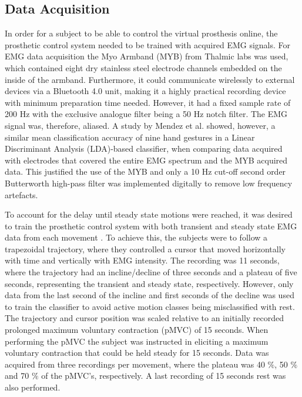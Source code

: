 \subsection{Data Acquisition}

In order for a subject to be able to control the virtual prosthesis online, the prosthetic control system needed to be trained with acquired EMG signals. For EMG data acquisition the Myo Armband (MYB) from Thalmic labs was used, which contained eight dry stainless steel electrode channels embedded on the inside of the armband. Furthermore, it could communicate wirelessly to external devices via a Bluetooth 4.0 unit, making it a highly practical recording device with minimum preparation time needed. However, it had a fixed sample rate of 200 Hz with the exclusive analogue filter being a 50 Hz notch filter. The EMG signal was, therefore, aliased. A study by Mendez et al. \cite{Mendez2017} showed, however, a similar mean classification accuracy of nine hand gestures in a Linear Discriminant Analysis (LDA)-based classifier, when comparing data acquired with electrodes that covered the entire EMG spectrum and the MYB acquired data. This justified the use of the MYB and only a 10 Hz cut-off second order Butterworth high-pass filter was implemented digitally to remove low frequency artefacts.

To account for the delay until steady state motions were reached, it was desired to train the prosthetic control system with both transient and steady state EMG data from each movement \cite{Boschmann2013}. To achieve this, the subjects were to follow a trapezoidal trajectory, where they controlled a cursor that moved horizontally with time and vertically with EMG intensity. The recording was 11 seconds, where the trajectory had an incline/decline of three seconds and a plateau of five seconds, representing the transient and steady state, respectively. However, only data from the last second of the incline and first seconds of the decline was used to train the classifier to avoid active motion classes being misclassified with rest. The trajectory and cursor position was scaled relative to an initially recorded prolonged maximum voluntary contraction (pMVC) of 15 seconds. When performing the pMVC the subject was instructed in eliciting a maximum voluntary contraction that could be held steady for 15 seconds. Data was acquired from three recordings per movement, where the plateau was 40 $\%$, 50 $\%$ and 70 $\%$ of the pMVC's, respectively. A last recording of 15 seconds rest was also performed.

